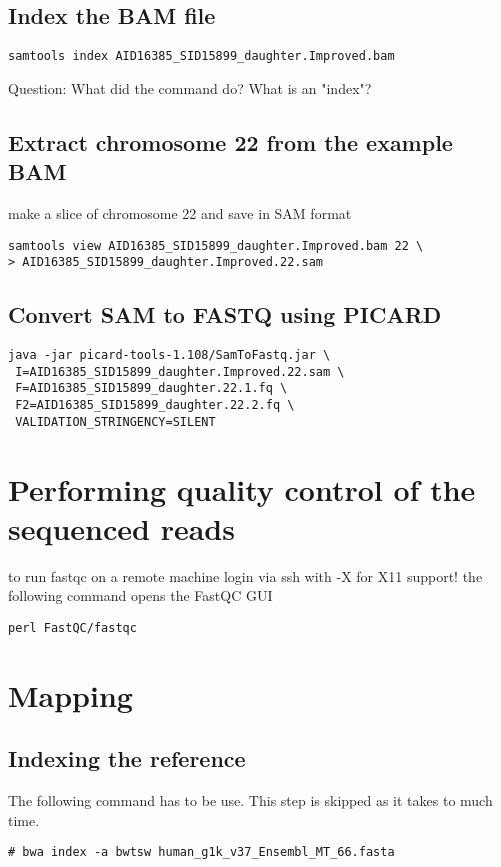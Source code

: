 \documentclass{article}
\begin{document}
\subsection{Index the BAM file}
\begin{verbatim}
samtools index AID16385_SID15899_daughter.Improved.bam
\end{verbatim}
Question: What did the command do? What is an "index"?

\subsection{Extract chromosome 22 from the example BAM}
make a slice of chromosome 22 and save in SAM format
\begin{verbatim}
samtools view AID16385_SID15899_daughter.Improved.bam 22 \
> AID16385_SID15899_daughter.Improved.22.sam
\end{verbatim}

\subsection{Convert SAM to FASTQ using PICARD}
\begin{verbatim}
java -jar picard-tools-1.108/SamToFastq.jar \
 I=AID16385_SID15899_daughter.Improved.22.sam \
 F=AID16385_SID15899_daughter.22.1.fq \
 F2=AID16385_SID15899_daughter.22.2.fq \
 VALIDATION_STRINGENCY=SILENT
\end{verbatim}

\section{Performing quality control of the sequenced reads}
to run fastqc on a remote machine login via ssh with -X for X11 support!
the following command opens the FastQC GUI
\begin{verbatim}
perl FastQC/fastqc
\end{verbatim}



\section{Mapping}
\subsection{Indexing the reference }
The following command has to be use. This step is skipped as it takes to much time.
\begin{verbatim}
# bwa index -a bwtsw human_g1k_v37_Ensembl_MT_66.fasta
\end{verbatim}
\end{document}
